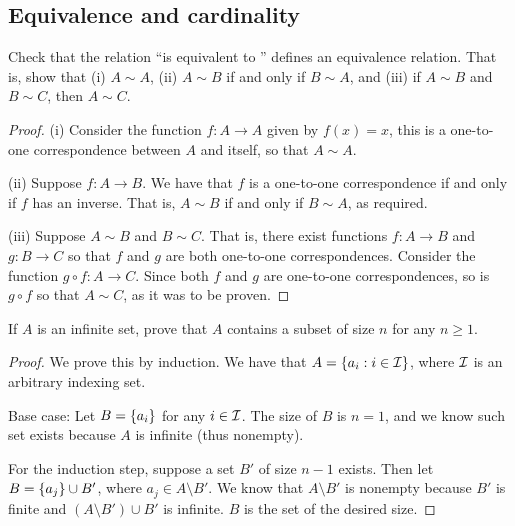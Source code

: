 \subsection{Equivalence and cardinality}


\begin{exercise}{1}
Check that the relation ``is equivalent to '' defines an equivalence relation. That is, show that (i) $A\sim A$, (ii) $A\sim B$ if and only if $B\sim A$, and (iii) if $A\sim B$ and $B\sim C$, then $A\sim C$.
\end{exercise}
\begin{proof}
(i) Consider the function $f:A\to A$ given by $f(x)=x$, this is a one-to-one correspondence between $A$ and itself, so that $A\sim A$.

(ii) Suppose $f:A\to B$. We have that $f$ is a one-to-one correspondence if and only if $f$ has an inverse. That is, $A\sim B$ if and only if $B\sim A$, as required.

(iii) Suppose $A\sim B$ and $B\sim C$. That is, there exist functions $f:A\to B$ and $g:B\to C$ so that $f$ and $g$ are both one-to-one correspondences. Consider the function $g\circ f:A\to C$. Since both $f$ and $g$ are one-to-one correspondences, so is $g\circ f$ so that $A\sim C$, as it was to be proven.
\end{proof} 

\begin{exercise}{2}
If $A$ is an infinite set, prove that $A$ contains a subset of size $n$ for any $n\geq 1$.
\end{exercise}
\begin{proof}
We prove this by induction. We have that $A=\{a_i: i\in\mathcal{I}\}$, where $\mathcal{I}$ is an arbitrary indexing set. 

Base case: Let $B=\{a_i\}$ for any $i\in\mathcal{I}$. The size of $B$ is $n=1$, and we know such set exists because $A$ is infinite (thus nonempty).

For the induction step, suppose a set $B'$ of size $n-1$ exists. Then let $B=\{a_j\}\cup B'$, where $a_j\in A\setminus B'$. We know that $A\setminus B'$ is nonempty because $B'$ is finite and $(A\setminus B')\cup B'$ is infinite. $B$ is the set of the desired size.
\end{proof} 

